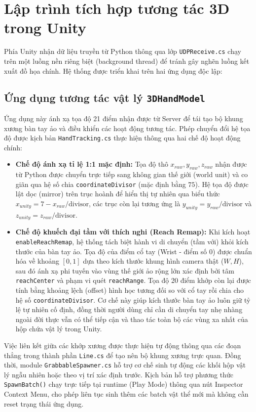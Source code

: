\documentclass[../BTL.tex]{subfiles}
\begin{document}
\section{Lập trình tích hợp tương tác 3D trong Unity}
\label{section:3.3}
Phía Unity nhận dữ liệu truyền từ Python thông qua lớp \texttt{UDPReceive.cs} chạy trên một luồng nền riêng biệt (background thread) để tránh gây nghẽn luồng kết xuất đồ họa chính. Hệ thống được triển khai trên hai ứng dụng độc lập:

\subsection{Ứng dụng tương tác vật lý \texttt{3DHandModel}}
Ứng dụng này ánh xạ tọa độ 21 điểm nhận được từ Server để tái tạo bộ khung xương bàn tay ảo và điều khiển các hoạt động tương tác. Phép chuyển đổi hệ tọa độ được kịch bản \texttt{HandTracking.cs} thực hiện thông qua hai chế độ hoạt động chính:
\begin{itemize}
    \item \textbf{Chế độ ánh xạ tỉ lệ 1:1 mặc định:} Tọa độ thô $x_{raw}, y_{raw}, z_{raw}$ nhận được từ Python được chuyển trực tiếp sang không gian thế giới (world unit) và co giãn qua hệ số chia \texttt{coordinateDivisor} (mặc định bằng $75$). Hệ tọa độ được lật dọc (mirror) trên trục hoành để hiển thị tự nhiên qua biểu thức $x_{unity} = 7 - x_{raw} / \text{divisor}$, các trục còn lại tương ứng là $y_{unity} = y_{raw} / \text{divisor}$ và $z_{unity} = z_{raw} / \text{divisor}$.
    \item \textbf{Chế độ khuếch đại tầm với thích nghi (Reach Remap):} Khi kích hoạt \texttt{enableReachRemap}, hệ thống tách biệt hành vi di chuyển (tầm với) khỏi kích thước của bàn tay ảo. Tọa độ của điểm cổ tay (Wrist - điểm số 0) được chuẩn hóa về khoảng $[0, 1]$ dựa theo kích thước khung hình camera thật ($W, H$), sau đó ánh xạ phi tuyến vào vùng thế giới ảo rộng lớn xác định bởi tâm \texttt{reachCenter} và phạm vi quét \texttt{reachRange}. Tọa độ 20 điểm khớp còn lại được tính bằng khoảng lệch (offset) hình học tương đối so với cổ tay rồi chia cho hệ số \texttt{coordinateDivisor}. Cơ chế này giúp kích thước bàn tay ảo luôn giữ tỷ lệ tự nhiên cố định, đồng thời người dùng chỉ cần di chuyển tay nhẹ nhàng ngoài đời thực vẫn có thể tiếp cận và thao tác toàn bộ các vùng xa nhất của hộp chứa vật lý trong Unity.
\end{itemize}
Việc liên kết giữa các khớp xương được thực hiện tự động thông qua các đoạn thẳng trong thành phần \texttt{Line.cs} để tạo nên bộ khung xương trực quan. Đồng thời, module \texttt{GrabbableSpawner.cs} hỗ trợ cơ chế sinh tự động các khối hộp vật lý ngẫu nhiên hoặc theo vị trí xác định trước. Kịch bản hỗ trợ phương thức \texttt{SpawnBatch()} chạy trực tiếp tại runtime (Play Mode) thông qua nút Inspector Context Menu, cho phép liên tục sinh thêm các batch vật thể mới mà không cần reset trạng thái ứng dụng.
\end{document}
